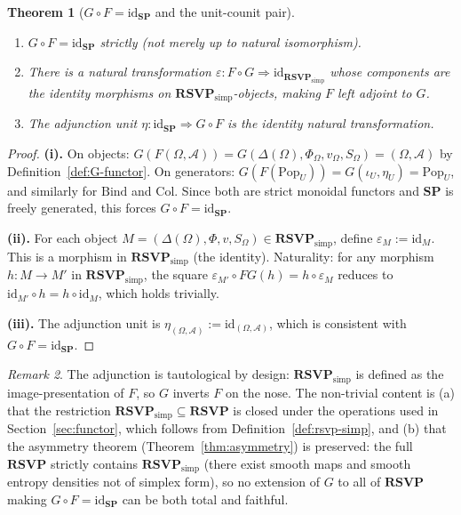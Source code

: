 \documentclass[12pt,a4paper]{article}
\newtheorem{theorem}{Theorem}[section]
\theoremstyle{definition}
\theoremstyle{remark}
\newtheorem{remark}[theorem]{Remark}
\newcommand{\SP}{\mathbf{SP}}
\newcommand{\RSVP}{\mathbf{RSVP}}
\providecommand{\id}{\mathrm{id}}
\renewcommand{\id}{\mathrm{id}}
\newcommand{\Pop}{\ensuremath{\mathrm{Pop}}}
\newcommand{\Bind}{\ensuremath{\mathrm{Bind}}}
\newcommand{\Col}{\ensuremath{\mathrm{Col}}}
\begin{document}
\begin{theorem}[$G\circ F=\id_{\SP}$ and the unit-counit pair]
\label{thm:adjunction}
\begin{enumerate}[label=(\roman*)]
  \item $G\circ F=\id_{\SP}$ strictly (not merely up to natural isomorphism).
  \item There is a natural transformation $\varepsilon:F\circ G\Rightarrow
    \id_{\RSVP_{\mathrm{simp}}}$ whose components are the identity morphisms
    on $\RSVP_{\mathrm{simp}}$-objects, making $F$ left adjoint to $G$.
  \item The adjunction unit $\eta:\id_{\SP}\Rightarrow G\circ F$ is the identity
    natural transformation.
\end{enumerate}
\end{theorem}

\begin{proof}
\textbf{(i).} On objects: $G(F(\Omega,\mathcal{A}))=G(\Delta(\Omega),\Phi_\Omega,v_\Omega,
S_\Omega)=(\Omega,\mathcal{A})$ by Definition~\ref{def:G-functor}. On generators:
$G(F(\Pop_U))=G(\iota_U,\eta_U)=\Pop_U$, and similarly for $\Bind$ and $\Col$.
Since both are strict monoidal functors and $\SP$ is freely generated, this forces
$G\circ F=\id_{\SP}$.

\textbf{(ii).} For each object $M=(\Delta(\Omega),\Phi,v,S_\Omega)\in\RSVP_{\mathrm{simp}}$,
define $\varepsilon_M:=\id_M$. This is a morphism in $\RSVP_{\mathrm{simp}}$ (the
identity). Naturality: for any morphism $h:M\to M'$ in $\RSVP_{\mathrm{simp}}$,
the square $\varepsilon_{M'}\circ FG(h)=h\circ\varepsilon_M$ reduces to
$\id_{M'}\circ h = h\circ\id_M$, which holds trivially.

\textbf{(iii).} The adjunction unit is $\eta_{(\Omega,\mathcal{A})}:=\id_{(\Omega,\mathcal{A})}$,
which is consistent with $G\circ F=\id_{\SP}$.
\end{proof}

\begin{remark}
The adjunction is tautological by design: $\RSVP_{\mathrm{simp}}$ is defined as the
image-presentation of $F$, so $G$ inverts $F$ on the nose. The non-trivial content
is (a) that the restriction $\RSVP_{\mathrm{simp}}\subseteq\RSVP$ is closed under
the operations used in Section~\ref{sec:functor}, which follows from
Definition~\ref{def:rsvp-simp}, and (b) that the asymmetry theorem
(Theorem~\ref{thm:asymmetry}) is preserved: the full $\RSVP$ strictly contains
$\RSVP_{\mathrm{simp}}$ (there exist smooth maps and smooth entropy densities not
of simplex form), so no extension of $G$ to all of $\RSVP$ making
$G\circ F=\id_{\SP}$ can be both total and faithful.
\end{remark}
\end{document}
